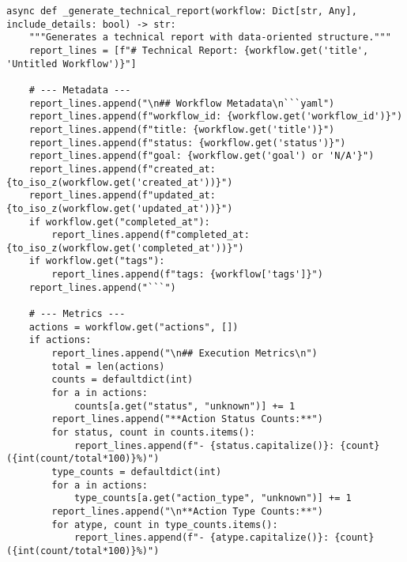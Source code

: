 \documentclass[12pt,a4paper]{article}
\begin{document}
\begin{pageablecode}
\begin{verbatim}
async def _generate_technical_report(workflow: Dict[str, Any], include_details: bool) -> str:
    """Generates a technical report with data-oriented structure."""
    report_lines = [f"# Technical Report: {workflow.get('title', 'Untitled Workflow')}"]

    # --- Metadata ---
    report_lines.append("\n## Workflow Metadata\n```yaml")
    report_lines.append(f"workflow_id: {workflow.get('workflow_id')}")
    report_lines.append(f"title: {workflow.get('title')}")
    report_lines.append(f"status: {workflow.get('status')}")
    report_lines.append(f"goal: {workflow.get('goal') or 'N/A'}")
    report_lines.append(f"created_at: {to_iso_z(workflow.get('created_at'))}")
    report_lines.append(f"updated_at: {to_iso_z(workflow.get('updated_at'))}")
    if workflow.get("completed_at"): 
        report_lines.append(f"completed_at: {to_iso_z(workflow.get('completed_at'))}")
    if workflow.get("tags"):
        report_lines.append(f"tags: {workflow['tags']}")
    report_lines.append("```")

    # --- Metrics ---
    actions = workflow.get("actions", [])
    if actions:
        report_lines.append("\n## Execution Metrics\n")
        total = len(actions)
        counts = defaultdict(int)
        for a in actions: 
            counts[a.get("status", "unknown")] += 1
        report_lines.append("**Action Status Counts:**")
        for status, count in counts.items(): 
            report_lines.append(f"- {status.capitalize()}: {count} ({int(count/total*100)}%)")
        type_counts = defaultdict(int)
        for a in actions: 
            type_counts[a.get("action_type", "unknown")] += 1
        report_lines.append("\n**Action Type Counts:**")
        for atype, count in type_counts.items(): 
            report_lines.append(f"- {atype.capitalize()}: {count} ({int(count/total*100)}%)")


\end{verbatim}
\end{pageablecode}
\end{document}
